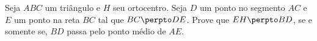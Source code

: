 Seja $ABC$ um triângulo e $H$ seu ortocentro. Seja $D$ um ponto no segmento $AC$ e $E$ um ponto na reta $BC$ tal que $BC \perpto DE$. Prove que $EH \perpto BD$, se e somente se, $BD$ passa pelo ponto médio de $AE$.